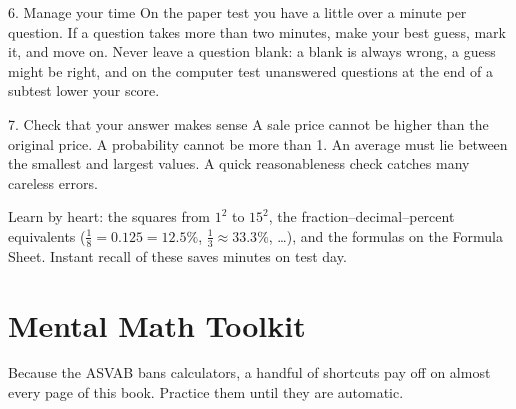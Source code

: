 \begin{concept}{6. Manage your time}
On the paper test you have a little over a minute per question. If a question
takes more than two minutes, make your best guess, mark it, and move on. Never
leave a question blank: a blank is always wrong, a guess might be right, and
on the computer test unanswered questions at the end of a subtest lower your
score.
\end{concept}

\begin{concept}{7. Check that your answer makes sense}
A sale price cannot be higher than the original price. A probability cannot
be more than 1. An average must lie between the smallest and largest values.
A quick reasonableness check catches many careless errors.
\end{concept}

\begin{tip}
Learn by heart: the squares from $1^2$ to $15^2$, the fraction--decimal--percent
equivalents ($\frac18 = 0.125 = 12.5\%$, $\frac13 \approx 33.3\%$, \ldots), and
the formulas on the Formula Sheet. Instant recall of these saves minutes on
test day.
\end{tip}

\section*{Mental Math Toolkit}
Because the ASVAB bans calculators, a handful of shortcuts pay off on almost
every page of this book. Practice them until they are automatic.

